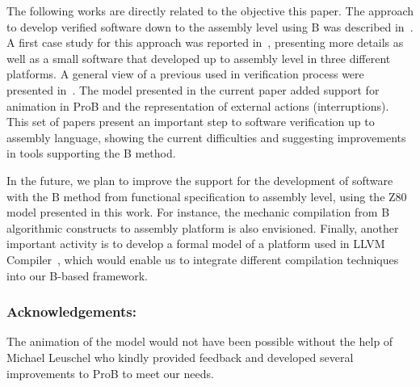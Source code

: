 \documentclass[a4paper]{llncs}
\begin{document}
The following works are directly related to the objective this paper.
The approach to develop verified software down to the assembly level
using B was described in~\cite{DantasSemish2008}. A first case study
for this approach was reported in~\cite{Dantas_SBMF08}, presenting
more details as well as a small software that developed up to assembly
level in three different platforms. A general view of a previous used
in verification process were presented in~\cite{Valerio_SBMF09}. The
model presented in the current paper added support for animation in
ProB and the representation of external actions (interruptions).
This set of papers present an important step to software verification
up to assembly language, showing the current difficulties and
suggesting improvements in tools supporting the B method.


In the future, we plan to improve the support for the development of
software with the B method from functional specification to assembly
level, using the Z80 model presented in this work. For instance, the
mechanic compilation from B algorithmic constructs to assembly
platform is also envisioned. Finally, another important activity is to
develop a formal model of a platform used in LLVM
Compiler~\cite{DBLP:conf/cgo/LattnerA04}, which would enable us to
integrate different compilation techniques into our B-based framework.




\subsubsection{Acknowledgements:} The animation of the model would not
have been possible without the help of Michael Leuschel who kindly
provided feedback and developed several improvements to ProB to meet our
needs.


  

%




% 
\end{document}
